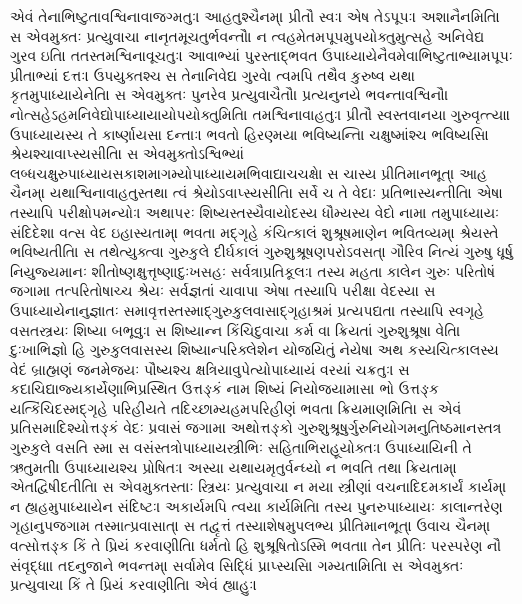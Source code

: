 \documentclass[a4paper,12pt]{article}
\begin{document}
એવં તેનાભિષ્ટુતાવશ્વિનાવાજગ્મતુઃ। આહતુશ્ચૈનમ્। પ્રીતૌ સ્વઃ। એષ તેઽપૂપઃ। અશાનૈનમિતિ।
સ એવમુક્તઃ પ્રત્યુવાચ। નાનૃતમૂચતુર્ભવન્તૌ। ન ત્વહમેતમપૂપમુપયોક્તુમુત્સહે અનિવેદ્ય ગુરવ ઇતિ।
તતસ્તમશ્વિનાવૂચતુઃ। આવાભ્યાં પુરસ્તાદ્ભવત ઉપાધ્યાયેનૈવમેવાભિષ્ટુતાભ્યામપૂપઃ પ્રીતાભ્યાં દત્તઃ। ઉપયુક્તશ્ચ સ તેનાનિવેદ્ય ગુરવે। ત્વમપિ તથૈવ કુરુષ્વ યથા કૃતમુપાધ્યાયેનેતિ।
સ એવમુક્તઃ પુનરેવ પ્રત્યુવાચૈતૌ। પ્રત્યનુનયે ભવન્તાવશ્વિનૌ। નોત્સહેઽહમનિવેદ્યોપાધ્યાયાયોપયોક્તુમિતિ।
તમશ્વિનાવાહતુઃ। પ્રીતૌ સ્વસ્તવાનયા ગુરુવૃત્ત્યા। ઉપાધ્યાયસ્ય તે કાર્ષ્ણાયસા દન્તાઃ। ભવતો હિરણ્મયા ભવિષ્યન્તિ। ચક્ષુષ્માંશ્ચ ભવિષ્યસિ। શ્રેયશ્ચાવાપ્સ્યસીતિ।
સ એવમુક્તોઽશ્વિભ્યાં લબ્ધચક્ષુરુપાધ્યાયસકાશમાગમ્યોપાધ્યાયમભિવાદ્યાચચક્ષે। સ ચાસ્ય પ્રીતિમાનભૂત્।
આહ ચૈનમ્। યથાશ્વિનાવાહતુસ્તથા ત્વં શ્રેયોઽવાપ્સ્યસીતિ। સર્વે ચ તે વેદાઃ પ્રતિભાસ્યન્તીતિ।
એષા તસ્યાપિ પરીક્ષોપમન્યોઃ।
અથાપરઃ શિષ્યસ્તસ્યૈવાયોદસ્ય ધૌમ્યસ્ય વેદો નામ।
તમુપાધ્યાયઃ સંદિદેશ। વત્સ વેદ ઇહાસ્યતામ્। ભવતા મદ્ગૃહે કંચિત્કાલં શુશ્રૂષમાણેન ભવિતવ્યમ્। શ્રેયસ્તે ભવિષ્યતીતિ।
સ તથેત્યુક્ત્વા ગુરુકુલે દીર્ઘકાલં ગુરુશુશ્રૂષણપરોઽવસત્। ગૌરિવ નિત્યં ગુરુષુ ધૂર્ષુ નિયુજ્યમાનઃ શીતોષ્ણક્ષુત્તૃષ્ણાદુઃખસહઃ સર્વત્રાપ્રતિકૂલઃ।
તસ્ય મહતા કાલેન ગુરુઃ પરિતોષં જગામ। તત્પરિતોષાચ્ચ શ્રેયઃ સર્વજ્ઞતાં ચાવાપ। એષા તસ્યાપિ પરીક્ષા વેદસ્ય।
સ ઉપાધ્યાયેનાનુજ્ઞાતઃ સમાવૃત્તસ્તસ્માદ્ગુરુકુલવાસાદ્ગૃહાશ્રમં પ્રત્યપદ્યત। તસ્યાપિ સ્વગૃહે વસતસ્ત્રયઃ શિષ્યા બભૂવુઃ।
સ શિષ્યાન્ન કિંચિદુવાચ। કર્મ વા ક્રિયતાં ગુરુશુશ્રૂષા વેતિ। દુઃખાભિજ્ઞો હિ ગુરુકુલવાસસ્ય શિષ્યાન્પરિક્લેશેન યોજયિતું નેયેષ।
અથ કસ્યચિત્કાલસ્ય વેદં બ્રાહ્મણં જનમેજયઃ પૌષ્યશ્ચ ક્ષત્રિયાવુપેત્યોપાધ્યાયં વરયાં ચક્રતુઃ।
સ કદાચિદ્યાજ્યકાર્યેણાભિપ્રસ્થિત ઉત્તઙ્કં નામ શિષ્યં નિયોજયામાસ। ભો ઉત્તઙ્ક યત્કિંચિદસ્મદ્ગૃહે પરિહીયતે તદિચ્છામ્યહમપરિહીણં ભવતા ક્રિયમાણમિતિ।
સ એવં પ્રતિસમાદિશ્યોત્તઙ્કં વેદઃ પ્રવાસં જગામ।
અથોત્તઙ્કો ગુરુશુશ્રૂષુર્ગુરુનિયોગમનુતિષ્ઠમાનસ્તત્ર ગુરુકુલે વસતિ સ્મ।
સ વસંસ્તત્રોપાધ્યાયસ્ત્રીભિઃ સહિતાભિરાહૂયોક્તઃ। ઉપાધ્યાયિની તે ઋતુમતી। ઉપાધ્યાયશ્ચ પ્રોષિતઃ। અસ્યા યથાયમૃતુર્વન્ધ્યો ન ભવતિ તથા ક્રિયતામ્। એતદ્વિષીદતીતિ।
સ એવમુક્તસ્તાઃ સ્ત્રિયઃ પ્રત્યુવાચ। ન મયા સ્ત્રીણાં વચનાદિદમકાર્યં કાર્યમ્। ન હ્યહમુપાધ્યાયેન સંદિષ્ટઃ। અકાર્યમપિ ત્વયા કાર્યમિતિ।
તસ્ય પુનરુપાધ્યાયઃ કાલાન્તરેણ ગૃહાનુપજગામ તસ્માત્પ્રવાસાત્। સ તદ્વૃત્તં તસ્યાશેષમુપલભ્ય પ્રીતિમાનભૂત્।
ઉવાચ ચૈનમ્। વત્સોત્તઙ્ક કિં તે પ્રિયં કરવાણીતિ। ધર્મતો હિ શુશ્રૂષિતોઽસ્મિ ભવતા। તેન પ્રીતિઃ પરસ્પરેણ નૌ સંવૃદ્ધા। તદનુજાને ભવન્તમ્। સર્વામેવ સિદ્ધિં પ્રાપ્સ્યસિ। ગમ્યતામિતિ।
સ એવમુક્તઃ પ્રત્યુવાચ। કિં તે પ્રિયં કરવાણીતિ। એવં હ્યાહુઃ।
\end{document}
